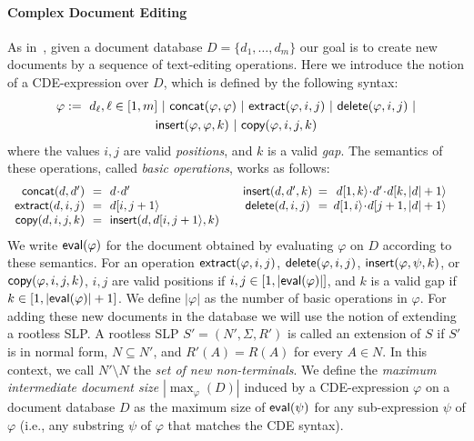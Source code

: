 \paragraph{Complex Document Editing}
As in~\cite{SchmidS22}, given a document database $D = \{d_1, \ldots, d_m\}$ our goal is to create new documents by a sequence of text-editing operations.
Here we introduce the notion of a CDE-expression over $D$, which is defined by the following syntax:
\begin{multline*}
	\varphi := \ d_\ell, \ell\in[1, m]\ | \ \textsf{concat}(\varphi, \varphi)\ | \ \textsf{extract}(\varphi, i, j) \ | \
	\textsf{delete}(\varphi, i, j) \ | \\ \textsf{insert}(\varphi, \varphi, k) \ | \ \textsf{copy}(\varphi, i, j, k)
\end{multline*}
where the values $i,j$ are valid {\it positions}, and $k$ is a valid {\it gap}. %
The semantics of these operations, called {\it basic operations}, works as follows:
$$
\begin{array}{rclrclrclrcl}
	\concat(d, d') \!\!&=&\!\! d\!\cdot \!d' \ &&\insertop(d, d', k) \!\!\!&=&\!\!\! d\spanc{1}{k}\!\cdot\! d'\!\cdot\! d\spanc{k}{|d|+1}&\\
	\extract(d, i, j) \!\!&=&\!\! d\spanc{i}{j+1} \ &&\delete(d, i, j) \!\!\!&=&\!\!\! d\spanc{1}{i}\!\cdot\! d\spanc{j+1}{|d|+1}&\\
	\copyop(d, i, j, k) \!\!&=&\!\! \insertop(d, d\spanc{i}{j+1}, k) 	
\end{array}
$$
We write $\textsf{eval}(\varphi)$ for the document obtained by evaluating $\varphi$ on $D$ according to these semantics. For an operation $\textsf{extract}(\varphi, i, j)$, $\textsf{delete}(\varphi, i, j)$, $\textsf{insert}(\varphi, \psi, k)$, or \linebreak $\textsf{copy}(\varphi, i, j, k)$, $i,j$ are valid positions if $i, j\in [1, |\textsf{eval}(\varphi)|]$, and $k$ is a valid gap if $k\in [1, |\textsf{eval}(\varphi)| + 1]$.
We define $|\varphi|$ as the number of basic operations in $\varphi$.
For adding these new documents in the database we will use the notion of extending a rootless SLP. A rootless SLP $S' = (N', \Sigma, R')$ is called an extension of $S$ if $S'$ is in normal form, $N\subseteq N'$, and $R'(A) = R(A)$ for every $A\in N$. In this context, we call $N'\setminus N$ the {\it set of new non-terminals}.
We define the {\it maximum intermediate document size} $|\max_{\varphi}(D)|$ induced by a CDE-expression $\varphi$ on a document database $D$ as the maximum size of $\textsf{eval}(\psi)$ for any sub-expression $\psi$ of $\varphi$ (i.e., any substring $\psi$ of $\varphi$ that matches the CDE syntax).

